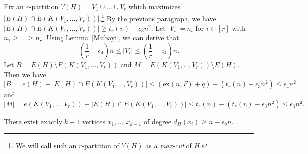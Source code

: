 \documentclass[10pt]{article}
\makeatletter
\newcommand*{\rom}[1]{\expandafter\@slowromancap\romannumeral #1@}
\def\ex{\mathrm{ex}}
\makeatother
\begin{document}
Fix an $r$-partition $V(H)=V_1\cup\ldots\cup V_r$ which maximizes $|E(H)\cap E(K(V_1,\ldots,V_r))|$.\footnote{We will call such an $r$-partition of $V(H)$ as a {\it max-cut} of $H$.}
By the previous paragraph, we have $|E(H)\cap E(K(V_1,\ldots,V_r))|\geq t_r(n)-\epsilon_3 n^2$.
Let $|V_i|=n_i$ for $i\in [r]$ with $n_1\geq \ldots \geq n_r$.
Using Lemma~\ref{Mubayi}, we can derive that
\begin{equation}\label{v_i}
\left(\frac{1}{r}-\epsilon_4\right)n\leq|V_i|\leq\left(\frac{1}{r}+\epsilon_4\right)n.
\end{equation}
Let $B=E(H)\setminus E(K(V_1,\ldots,V_r))$ and $M=E(K(V_1,\ldots,V_r))\setminus E(H)$. Then we have
\begin{equation}\label{B}
|B|=e(H)-|E(H)\cap E(K(V_1,\ldots,V_r))|\leq (\ex(n,F)+q)-(t_r(n)-\epsilon_3 n^2)\leq \epsilon_4n^2
\end{equation}
and
\begin{equation}\label{M}
|M|=e(K(V_1,\ldots,V_r))-|E(H)\cap E(K(V_1,\ldots,V_r))|\leq t_r(n)-(t_r(n)-\epsilon_3 n^2)\leq\epsilon_4n^2.
\end{equation}


\medskip


\noindent {\bf Claim \rom{1}.} There exist exactly $k-1$ vertices $x_1,\ldots, x_{k-1}$ of degree $d_H(x_i)\geq n-\epsilon_9n$.
\end{document}

